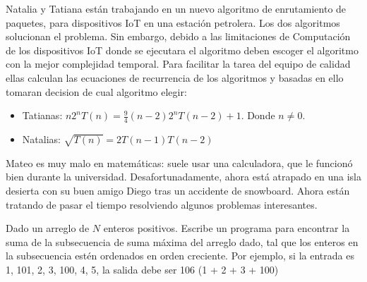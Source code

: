 \documentclass[12pt, a4paper]{exam}
\begin{document}
\begin{questions}
    \pointsdroppedatright
    \question
    Natalia y Tatiana están trabajando en un nuevo algoritmo de enrutamiento de paquetes,
    para dispositivos IoT en una estación petrolera. Los dos algoritmos solucionan el 
    problema. Sin embargo, debido a las limitaciones de Computación de los dispositivos IoT
    donde se ejecutara el algoritmo deben escoger el algoritmo con la mejor complejidad
    temporal. Para facilitar la tarea del equipo de calidad ellas calculan las ecuaciones
    de recurrencia de los algoritmos y basadas en ello tomaran decision de cual algoritmo 
    elegir:
    \begin{itemize}
        \item Tatianas: $ n2^{n}T(n) = \frac{9}{4} (n-2)2^{n}T(n-2) + 1$. Donde \textbf{$
        n \not = 0$}.
        \item Natalias: $ \sqrt{T(n)} = 2T(n-1)T(n-2)$

    \end{itemize}
    
    \question
    Mateo es muy malo en matemáticas: suele usar una calculadora, que le funcionó bien
    durante la universidad. Desafortunadamente, ahora está atrapado en una isla desierta
    con su buen amigo Diego tras un accidente de snowboard. Ahora están tratando de pasar
    el tiempo resolviendo algunos problemas interesantes.

    Dado un arreglo de $N$ enteros positivos. Escribe un programa para encontrar la suma de
    la subsecuencia de suma máxima del arreglo dado, tal que los enteros en la
    subsecuencia estén ordenados en orden creciente. Por ejemplo, si la entrada es {1,
    101, 2, 3, 100, 4, 5}, la salida debe ser 106 (1 + 2 + 3 + 100)

\end{questions}
\end{document}
